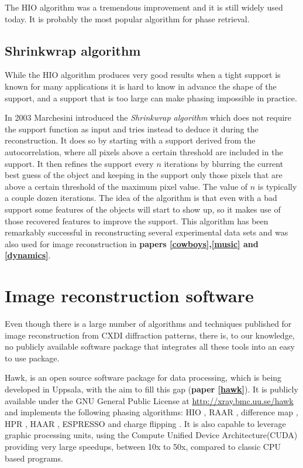 The HIO algorithm was a tremendous improvement and it is still widely used
today. It is probably the most popular algorithm for phase retrieval. 

\subsection{Shrinkwrap algorithm}

While the HIO algorithm produces very good results when a tight support is known
for many applications it is hard to know in advance the shape of the support,
and a support that is too large can make phasing impossible in practice. 

In 2003 Marchesini \cite{Marchesini2003Xray} introduced the {\em Shrinkwrap
  algorithm} which does not require the support function as input and tries instead
to deduce it during the reconstruction. It does so by starting with a
support derived from the autocorrelation, where all pixels above a certain
threshold are included in the support. It then refines the support every $n$
iterations by blurring the current best guess of the object and keeping in the
support only those pixels that are above a certain threshold of the maximum pixel
value. The value of $n$ is typically a couple dozen iterations. The idea of the
algorithm is that even with a bad support some features of the objects will
start to show up, so it makes use of those recovered features to improve the
support. This algorithm has been remarkably successful in reconstructing several
experimental data sets
\cite{Chapman2006Highresolution,Barty2008Ultrafast,Barty2008Threedimensional} and was also used for image reconstruction in {\bf papers
\ref{cowboys},\ref{music} and \ref{dynamics}}.

\section{Image reconstruction software}

Even though there is a large number of algorithms and techniques published for
image reconstruction from CXDI diffraction patterns, there is, to our knowledge, no publicly available
software package that integrates all these tools into an easy to use package.

Hawk, is an open source software package for data processing, which is being
developed in Uppsala, with the aim to fill
this gap ({\bf paper \ref{hawk}}). It is publicly available under the GNU General Public License at
\url{http://xray.bmc.uu.se/hawk}  and implements the following phasing algorithms:
 HIO \cite{Fienup1982Phase}, RAAR \cite{Luke2005Relaxed}, difference map
 \cite{Elser2003Phase}, HPR \cite{Bauschke2003Hybrid}, HAAR \cite{Bauschke2006Strongly}, ESPRESSO
\cite{Marchesini2008Ab} and charge flipping
\cite{Oszlanyi2004Ab,Oszlanyi2005It}. It is also
capable to leverage graphic processing units, using the Compute Unified Device
Architecture(CUDA) providing very large speedups, between 10x to 50x, compared to classic CPU based programs. 

